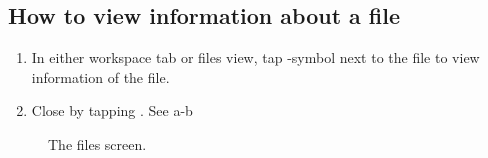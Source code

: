 \subsection{How to view information about a file}

\begin{enumerate}
\item In either workspace tab or files view, tap -symbol next to the file to view information of the file.
\item Close by tapping . See a-b
\end{enumerate}

\begin{figure}[htb]
\caption{The files screen.}
\label{fig:ios_files1}
\end{figure}
\FloatBarrier

















